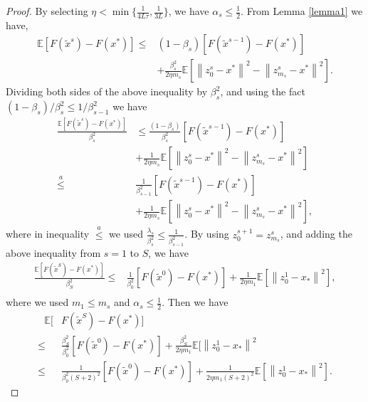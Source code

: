\documentclass{article}
\newcommand*{\E}{\mathbb{E}}
\newcommand{\norm}[1]{\left\lVert#1\right\rVert}
\theoremstyle{definition}
\theoremstyle{remark}
\begin{document}
\begin{proof}
By selecting $\eta < \min\{\frac{1}{4L
\tau}, \frac{1}{3L}\}$, we have $\alpha_s\leq \frac{1}{2}$. From Lemma \ref{lemma1} we have,
\begin{equation}
\begin{split}
\E[F(\widetilde{x}^s)-F(x^*)] \leq &(1-\beta_s)[F(\widetilde{x}^{s-1})-F(x^*)] \\
&+ {\frac{ \beta_s^2}{2\eta m_s}}\E[\norm{z_{0}^s-x^*}^2-\norm{z_{m_s}^s-x^*}^2]. 
\end{split}
\end{equation}
Dividing both sides of the above inequality by $\beta_s^2$, and using the fact $(1-\beta_s)/\beta_s^2 \leq 1/\beta_{s-1}^2$ we have
\begin{equation*}
\begin{split}
\frac{\E[F(\widetilde{x}^s)-F(x^*)]}{\beta_s^2}&\leq  \frac{(1-\beta_s)}{\beta_s^2}[F(\widetilde{x}^{s-1})-F(x^*)]\\ 
& + {\frac{1 }{2\eta m_s}}\E[\norm{z_{0}^s-x^*}^2-\norm{z_{m_s}^s-x^*}^2]\\
\stackrel{a}{\leq} & \frac{1}{\beta_{s-1}^2}[F(\widetilde{x}^{s-1})-F(x^*)] \\
&+ {\frac{1}{2\eta m_s}}\E[\norm{z_{0}^s-x^*}^2-\norm{z_{m_s}^s-x^*}^2], 
\end{split}
\end{equation*}
where in inequality $\stackrel{a}{\leq}$ we used $\frac{\lambda_s}{\beta_s^2}\leq \frac{1}{\beta_{s-1}^2}$. By using $z_0^{s+1} = z_{m_s}^s$, and adding the above inequality from $s=1$ to $S$, we have
\begin{equation*}
\begin{split}
\frac{\E[F(\widetilde{x}^S)-F(x^*)]}{\beta_S^2}\leq & \frac{1}{\beta_{0}^2}[F(\widetilde{x}^{0})-F(x^*)] + {\frac{1}{2\eta m_1}}\E\left[\norm{z_{0}^1-x_*}^2\right], \\
\end{split}
\end{equation*}
where we used $m_1\leq m_s$ and $\alpha_s\leq \frac{1}{2}$.
Then we have
\begin{equation*}
\begin{split}
~~~\E[& F(\widetilde{x}^S)-F(x^*)]\\
\leq & \frac{\beta_S^2}{\beta_{0}^2}[F(\widetilde{x}^{0})-F(x^*)]+ {\frac{ \beta_S^2}{2\eta m_1}}\E[\norm{z_{0}^1-x_*}^2\\
\leq & \frac{1}{\beta_{0}^2(S+2)^2}[F(\widetilde{x}^{0})-F(x^*)] + {\frac{1 }{2\eta m_1(S+2)^2}}\E[\norm{z_{0}^1-x_*}^2].
\end{split}
\end{equation*}


\end{proof}
\end{document}
